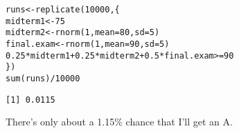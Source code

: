 \documentclass{beamer}\usepackage[]{graphicx}\usepackage[]{color}
\makeatletter
\newcommand{\hlnum}[1]{\textcolor[rgb]{0.824,0.412,0.118}{#1}}%
\newcommand{\hlopt}[1]{\textcolor[rgb]{1,0.894,0.769}{#1}}%
\newcommand{\hlstd}[1]{\textcolor[rgb]{1,0.894,0.769}{#1}}%
\newcommand{\hlkwb}[1]{\textcolor[rgb]{0.804,0.776,0.451}{#1}}%
\newcommand{\hlkwc}[1]{\textcolor[rgb]{0.78,0.941,0.545}{#1}}%
\newcommand{\hlkwd}[1]{\textcolor[rgb]{1,0.78,0.769}{#1}}%
\newenvironment{kframe}{%
 \def\at@end@of@kframe{}%
 \ifinner\ifhmode%
  \def\at@end@of@kframe{\end{minipage}}%
  \begin{minipage}{\columnwidth}%
 \fi\fi%
 \def\FrameCommand##1{\hskip\@totalleftmargin \hskip-\fboxsep
 \colorbox{shadecolor}{##1}\hskip-\fboxsep
     \hskip-\linewidth \hskip-\@totalleftmargin \hskip\columnwidth}%
 \MakeFramed {\advance\hsize-\width
   \@totalleftmargin\z@ \linewidth\hsize
   \@setminipage}}%
 {\par\unskip\endMakeFramed%
 \at@end@of@kframe}
\newenvironment{knitrout}{}{} %
\makeatother
\begin{document}
\begin{darkframes}
    \begin{frame}[fragile]
\begin{knitrout}
\begin{kframe}
\begin{alltt}
\hlstd{runs} \hlkwb{<-} \hlkwd{replicate}\hlstd{(}\hlnum{10000}\hlstd{, \{}
  \hlstd{midterm1} \hlkwb{<-} \hlnum{75}
  \hlstd{midterm2} \hlkwb{<-} \hlkwd{rnorm}\hlstd{(}\hlnum{1}\hlstd{,} \hlkwc{mean}\hlstd{=}\hlnum{80}\hlstd{,} \hlkwc{sd}\hlstd{=}\hlnum{5}\hlstd{)}
  \hlstd{final.exam} \hlkwb{<-} \hlkwd{rnorm}\hlstd{(}\hlnum{1}\hlstd{,} \hlkwc{mean}\hlstd{=}\hlnum{90}\hlstd{,} \hlkwc{sd}\hlstd{=}\hlnum{5}\hlstd{)}
  \hlnum{0.25}\hlopt{*}\hlstd{midterm1} \hlopt{+} \hlnum{0.25}\hlopt{*}\hlstd{midterm2} \hlopt{+} \hlnum{0.5}\hlopt{*}\hlstd{final.exam} \hlopt{>=} \hlnum{90}
\hlstd{\})}
\hlkwd{sum}\hlstd{(runs)} \hlopt{/} \hlnum{10000}
\end{alltt}
\begin{verbatim}
[1] 0.0115
\end{verbatim}
\end{kframe}
\end{knitrout}

      \pause
      There's only about a 1.15\% chance that I'll get an A.
    \end{frame}
  \end{darkframes}
\end{document}
